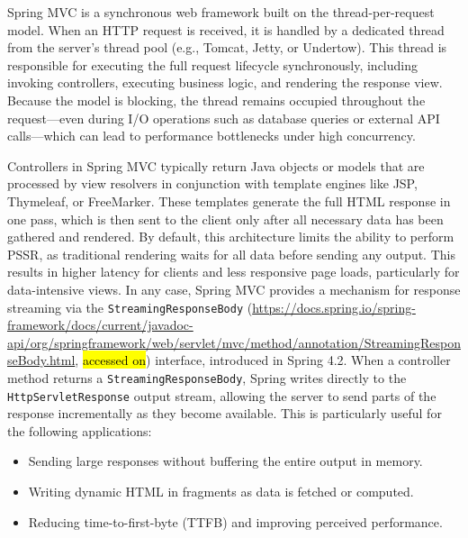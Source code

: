 \documentclass[software,article,accept,pdftex,moreauthors]{Definitions/mdpi}
\begin{document}
Spring MVC is a synchronous web framework built on the thread-per-request
model. When an HTTP request is received, it is handled by a dedicated thread
from the server’s thread pool (e.g., Tomcat, Jetty, or Undertow). This thread
is responsible for executing the full request lifecycle synchronously,
including invoking controllers, executing business logic, and rendering the
response view. Because the model is blocking, the thread remains occupied
throughout the request---even during I/O operations such as database queries or
external API calls---which can lead to performance bottlenecks under high
concurrency.

Controllers in Spring MVC typically return Java objects or models that are
processed by view resolvers in conjunction with template engines like JSP,
Thymeleaf, or FreeMarker. These templates generate the full HTML response in
one pass, which is then sent to the client only after all necessary data has
been gathered and rendered. By default, this architecture limits the ability to
perform PSSR, as traditional rendering waits for all data before sending any
output. This results in higher latency for clients and less responsive page
loads, particularly for data-intensive views. In any case, Spring MVC provides a
mechanism for response streaming via the
\texttt{StreamingResponseBody} ({\url{https://docs.spring.io/spring-framework/docs/current/javadoc-api/org/springframework/web/servlet/mvc/method/annotation/StreamingResponseBody.html}}, \hl{accessed on})
interface, introduced in Spring 4.2. When a controller method returns a
\texttt{StreamingResponseBody}, Spring writes directly to the
\texttt{HttpServletResponse} output stream, allowing the server to send parts
of the response incrementally as they become available. This is particularly
useful for the following applications:
\begin{itemize}
    \item Sending large responses without buffering the entire output in memory.
    \item Writing dynamic HTML in fragments as data is fetched or computed.
    \item Reducing time-to-first-byte (TTFB) and improving perceived performance.
\end{itemize}
\end{document}
